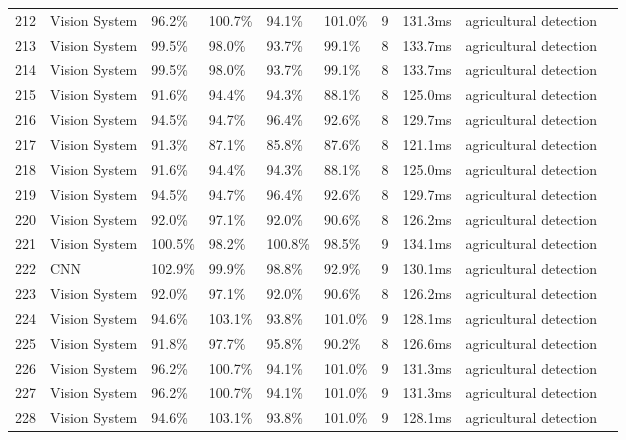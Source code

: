 \begin{table*}[htbp]
\begin{tabular}{p{}p{}p{}p{}p{}p{}p{}p{}p{}p{}}
 212 & Vision System & 96.2\% & 100.7\% & 94.1\% & 101.0\% & 9 & 131.3ms & agricultural detection & \cite{Loganathan:2024_hho_avoa} \\
 213 & Vision System & 99.5\% & 98.0\% & 93.7\% & 99.1\% & 8 & 133.7ms & agricultural detection & \cite{Bakar:2023} \\
 214 & Vision System & 99.5\% & 98.0\% & 93.7\% & 99.1\% & 8 & 133.7ms & agricultural detection & \cite{Lau:2023} \\
 215 & Vision System & 91.6\% & 94.4\% & 94.3\% & 88.1\% & 8 & 125.0ms & agricultural detection & \cite{Syed:2019_flex} \\
 216 & Vision System & 94.5\% & 94.7\% & 96.4\% & 92.6\% & 8 & 129.7ms & agricultural detection & \cite{Ahmad:2017} \\
 217 & Vision System & 91.3\% & 87.1\% & 85.8\% & 87.6\% & 8 & 121.1ms & agricultural detection & \cite{Ahmad:2013} \\
 218 & Vision System & 91.6\% & 94.4\% & 94.3\% & 88.1\% & 8 & 125.0ms & agricultural detection & \cite{Ng:2019_apf} \\
 219 & Vision System & 94.5\% & 94.7\% & 96.4\% & 92.6\% & 8 & 129.7ms & agricultural detection & \cite{Chan:2017_aw} \\
 220 & Vision System & 92.0\% & 97.1\% & 92.0\% & 90.6\% & 8 & 126.2ms & agricultural detection & \cite{Ahmad:2018_access} \\
 221 & Vision System & 100.5\% & 98.2\% & 100.8\% & 98.5\% & 9 & 134.1ms & agricultural detection & \cite{Ahmad:2022_cmc} \\
 222 & CNN & 102.9\% & 99.9\% & 98.8\% & 92.9\% & 9 & 130.1ms & agricultural detection & \cite{Goay:2021_access} \\
 223 & Vision System & 92.0\% & 97.1\% & 92.0\% & 90.6\% & 8 & 126.2ms & agricultural detection & \cite{Goay:2018} \\
 224 & Vision System & 94.6\% & 103.1\% & 93.8\% & 101.0\% & 9 & 128.1ms & agricultural detection & \cite{Ku:2020} \\
 225 & Vision System & 91.8\% & 97.7\% & 95.8\% & 90.2\% & 8 & 126.6ms & agricultural detection & \cite{Goay:2019} \\
 226 & Vision System & 96.2\% & 100.7\% & 94.1\% & 101.0\% & 9 & 131.3ms & agricultural detection & \cite{Ting:2024_ieee} \\
 227 & Vision System & 96.2\% & 100.7\% & 94.1\% & 101.0\% & 9 & 131.3ms & agricultural detection & \cite{Ting:2024_aej} \\
 228 & Vision System & 94.6\% & 103.1\% & 93.8\% & 101.0\% & 9 & 128.1ms & agricultural detection & \cite{Teo:2020} \\

\end{tabular}
\end{table*}
